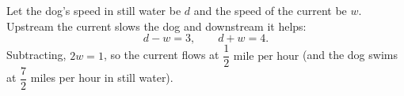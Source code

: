 Let the dog's speed in still water be $d$ and the speed of the current be $w$. Upstream the current slows the dog and downstream it helps:
\[d-w=3,\qquad d+w=4 .\]
Subtracting, $2w=1$, so the current flows at $\boxed{\dfrac{1}{2}\text{ mile per hour}}$ (and the dog swims at $\dfrac{7}{2}$ miles per hour in still water).
